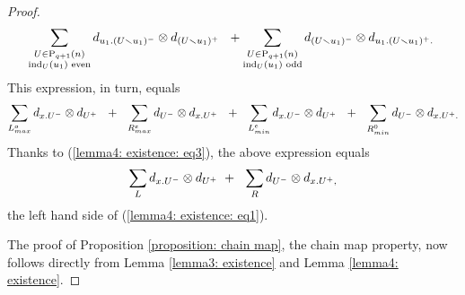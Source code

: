 \begin{proof}
\begin{align*}
	&\ \,\sum_{\substack{U \in \mathrm{P}_{q+1}(n) \\ \mathrm{ind}_U(u_1) \text{ even}}} d_{u_1.(U\smallsetminus u_1)^-} \otimes d_{(U\smallsetminus u_1)^+}\ \ +
	\sum_{\substack{U \in \mathrm{P}_{q+1}(n) \\ \mathrm{ind}_U(u_1) \text{ odd}}} d_{(U \smallsetminus u_1)^-} \otimes d_{u_1.(U\smallsetminus u_1)^+.}
	\end{align*}
	This expression, in turn, equals
	\begin{equation*} 
	\sum_{{L}_{max}^{o}} d_{x.U^-} \tensor d_{U^+}\ \ +\ \ 
	\sum_{{R}_{max}^{e}} d_{U^-} \tensor d_{x.U^+}\ \ +\ \ 
	\sum_{{L}_{min}^{e}} d_{x.U^-} \tensor d_{U^+}\ \ +\ \ 
	\sum_{{R}_{min}^{0}} d_{U^-} \tensor d_{x.U^+.}
	\end{equation*}
	Thanks to (\ref{lemma4: existence: eq3}), the above expression equals
	\begin{equation*}
	\sum_{L} d_{x.U^-} \tensor d_{U^+}\ +\ \ 
	\sum_{R} d_{U^-} \tensor d_{x.U^+,}
	\end{equation*}
	the left hand side of (\ref{lemma4: existence: eq1}).
	
	The proof of Proposition \ref{proposition: chain map}, the chain map property, now follows directly from Lemma \ref{lemma3: existence} and Lemma \ref{lemma4: existence}.
\end{proof}
